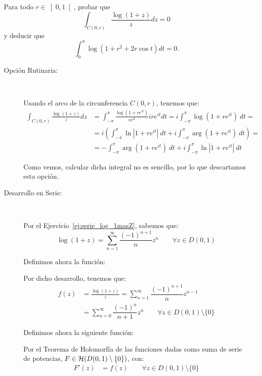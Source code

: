 \begin{ejercicio}
    Para todo $r \in \left]0,1\right[$, probar que
    \[
        \int_{C(0,r)} \frac{\log(1+z)}{z}dz = 0
    \]
    y deducir que
    \[
        \int_{0}^{\pi} \log(1+r^2 + 2r\cos t)dt = 0.
    \]

    \begin{description}
        \item[Opción Rutinaria:]~
        
        Usando el arco de la circunferencia $C(0,r)$, tenemos que:
        \begin{align*}
            \int_{C(0,r)} \frac{\log(1+z)}{z}dz &= \int_{-\pi}^{\pi} \frac{\log(1+re^{it})}{re^{it}}ire^{it}dt
            = i\int_{-\pi}^{\pi} \log(1+re^{it})\ dt
            =\\&= i\left(\int_{-\pi}^{\pi} \ln|1+re^{it}|\ dt + i\int_{-\pi}^{\pi} \arg(1+re^{it})\ dt\right)
            =\\&= -\int_{-\pi}^{\pi} \arg(1+re^{it})\ dt + i\int_{-\pi}^{\pi} \ln|1+re^{it}|\ dt
        \end{align*}

        Como vemos, calcular dicha integral no es sencillo, por lo que descartamos esta opción.

        \item[Desarrollo en Serie:]~
        
        Por el Ejercicio~\ref{ej:serie_log_1masZ}, sabemos que:
        \begin{equation*}
            \log(1+z) = \sum\limits_{n= 1}^\infty \dfrac{(-1)^{n+1}}{n}z^n\qquad \forall z \in D(0,1)
        \end{equation*}

        Definimos ahora la función:

        Por dicho desarrollo, tenemos que:
        \begin{align*}
            f(z) &= \frac{\log(1+z)}{z} = \sum\limits_{n= 1}^\infty \dfrac{(-1)^{n+1}}{n}z^{n-1}\\
            &= \sum\limits_{n=0}^\infty \dfrac{(-1)^{n}}{n+1}z^{n}\qquad \forall z \in D(0,1)\setminus \{0\}
        \end{align*}

        Definimos ahora la siguiente función:

        Por el Teorema de Holomorfía de las funciones dadas como suma de serie de potencias, $F\in \mathcal{H}(D(0,1)\setminus \{0\})$, con:
        \begin{align*}
            F'(z) &= f(z)\qquad \forall z \in D(0,1)\setminus \{0\}
        \end{align*}


\end{description}
\end{ejercicio}
